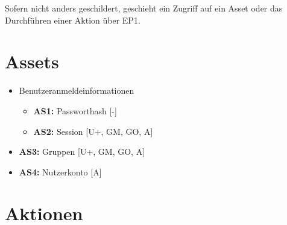 \documentclass[fontsize=12pt,DIV=14,BCOR=10mm,a4paper,parskip=half-,english,ngerman,bibliography=totocnumbered]{scrreprt}
\begin{document}
Sofern nicht anders geschildert, geschieht ein Zugriff auf ein Asset oder das Durchführen einer Aktion über EP1.

\chapter{Assets}

\begin{itemize}
  \item Benutzeranmeldeinformationen
  \begin{itemize}
    \item \textbf{AS1:} Passworthash [-]
    \item \textbf{AS2:} Session [U+, GM, GO, A]
  \end{itemize}
  \item \textbf{AS3:} Gruppen [U+, GM, GO, A]
  \item \textbf{AS4:} Nutzerkonto [A]
\end{itemize}

\chapter{Aktionen}
\end{document}
